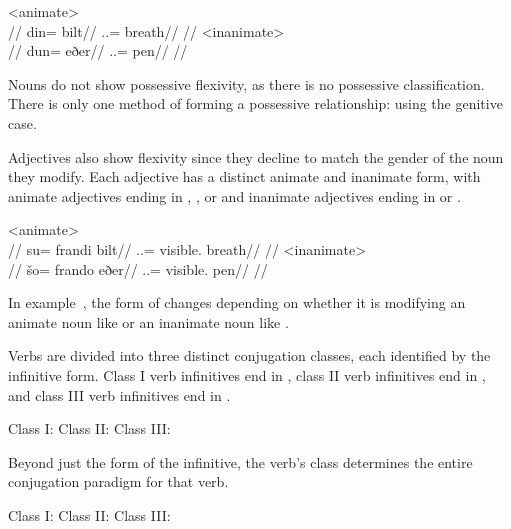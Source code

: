 	\a<animate>\begingl
		\glpreamble{}\\
		//
		\gla din= bilt//
		\glb \An.\Pl.\Erg= breath//
		\glft {}//
	\endgl
	\a<inanimate>\begingl
		\glpreamble{}\\
		//
		\gla dun= eðer//
		\glb \In.\Pl.\Erg= pen//
		\glft {}//
	\endgl
\xe

Nouns do not show possessive flexivity, as there is no possessive classification\autocite{wals-59}. There is only one method of forming a possessive relationship: using the genitive case.

Adjectives also show flexivity since they decline to match the gender of the noun they modify. Each adjective has a distinct animate and inanimate form, with animate adjectives ending in , , or  and inanimate adjectives ending in  or .

	\a<animate>\begingl
		\glpreamble{}\\
		//
		\gla su= frandi bilt//
		\glb \An.\Sg.\Gen= visible.\An{} breath//
		\glft {}//
	\endgl
	\a<inanimate>\begingl
		\glpreamble{}\\
		//
		\gla šo= frando eðer//
		\glb \In.\Sg.\Gen= visible.\In{} pen//
		\glft {}//
	\endgl
\xe

In example~, the form of  changes depending on whether it is modifying an animate noun like  or an inanimate noun like .

Verbs are divided into three distinct conjugation classes, each identified by the infinitive form. Class I verb infinitives end in , class II verb infinitives end in , and class III verb infinitives end in .

	Class I:    
	\a<cl2>Class II:    
	\a<cl3>Class III:    
\xe

Beyond just the form of the infinitive, the verb's class determines the entire conjugation paradigm for that verb.

	Class I:    
	\a<cl2>Class II:    
	\a<cl3>Class III:    
\xe

